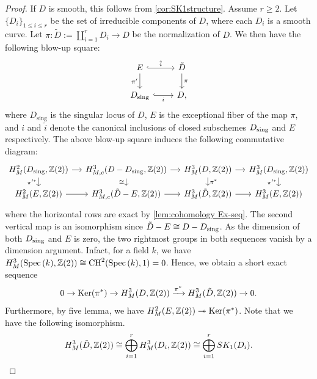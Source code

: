 \documentclass[12pt]{amsart}
\theoremstyle{remark}
\renewcommand{\1}{{\mathbb{S}}}
\newcommand{\Ker}{{\rm Ker}}
\newcommand{\CH}{{\rm CH}}
\newcommand{\Spec}{{\rm Spec \,}}
\newcommand{\sing}{{\rm sing}}
\newcommand{\<}{\langle}
\renewcommand{\>}{\rangle}
\begin{document}
\begin{proof}


 If $D$ is smooth, this follows from \autoref{cor:SK1structure}. Assume $r \geq 2$. Let $\{ D_{i} \}_{1 \leq i \leq r}$ be the set of irreducible components of $D$, where each $D_{i}$ is a smooth curve. Let $\pi \colon \tilde{D}:= \coprod_{i=1}^{r} D_{i}  \to D$ be the normalization of $D$. We then have the following blow-up square:
\[
\begin{tikzcd}
E \arrow[r, hookrightarrow, "\Tilde{i}"] \arrow[d, "\pi'"'] & \Tilde{D} \arrow[d, "\pi"] \\
D_{\sing} \arrow[r, hookrightarrow, "i"'] & D,
\end{tikzcd}
\]
where $D_{\text{sing}}$ is the singular locus of $D$, $E$ is the exceptional fiber of the map $\pi$, and $i$ and $\tilde{i}$ denote the canonical inclusions of closed subschemes $D_{\sing}$ and $E$ respectively. The above blow-up square induces the following commutative diagram:
\[
\begin{tikzcd}[column sep=small, row sep=small]
\scriptsize
H_{M}^{2}(D_{\sing}, \mathbb{Z}(2)) \arrow[r] \arrow[d, "\pi'^{\ast}"'] & 
H_{M,c}^{3}(D - D_{\sing}, \mathbb{Z}(2)) \arrow[r] \arrow[d, "\cong"'] & 
H_{M}^{3}(D, \mathbb{Z}(2)) \arrow[r] \arrow[d, "\pi^{\ast}"] & 
H_{M}^{3}(D_{\sing}, \mathbb{Z}(2)) \arrow[d, "\pi'^{\ast}"'] \\
H_{M}^{2}(E, \mathbb{Z}(2)) \arrow[r] & 
H_{M,c}^{3}(\Tilde{D} - E , \mathbb{Z}(2)) \arrow[r] & 
H_{M}^{3}(\Tilde{D} , \mathbb{Z}(2)) \arrow[r] & 
H_{M}^{3}(E, \mathbb{Z}(2))
\end{tikzcd}
\]
where the horizontal rows are exact by  \autoref{lem:cohomology Ex-seq}. The second vertical map is an isomorphism since $\Tilde{D} - E \cong D - D_{\sing}$. As the dimension of both $D_{\sing}$ and $E$ is zero, the two rightmost groups in both sequences vanish by a dimension argument. Infact, for a field $k$, we have $H_{M}^{3}(\Spec(k), \mathbb{Z}(2)) \cong \CH^{2}(\Spec(k), 1)  = 0$. Hence, we obtain a short exact sequence
\begin{equation}\label{classgroup-snc-exact-1}
    0 \rightarrow \Ker(\pi^{\ast}) \rightarrow H_{M}^{3}(D, \mathbb{Z}(2)) \xrightarrow{\pi^{\ast}} H_{M}^{3}(\Tilde{D} , \mathbb{Z}(2)) \rightarrow 0.
\end{equation}
Furthermore, by five lemma, we have $H_{M}^{2}(E, \mathbb{Z}(2)) \twoheadrightarrow \Ker(\pi^{\ast})$.  Note that we have the following isomorphism.
\begin{equation}
H_{M}^{3}(\Tilde{D}, \mathbb{Z}(2)) \cong \bigoplus_{i=1}^{r} H_{M}^{3}(D_{i}, \mathbb{Z}(2)) \cong \bigoplus_{i=1}^{r} SK_{1}(D_{i}).
\end{equation} 



\end{proof}
\end{document}
